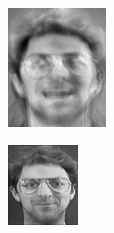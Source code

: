 \begin{figure}[!htb]
\centering
\begin{subfigure}[h]{0.18\textwidth}
  \centering
  \includegraphics[width=2.58cm]{figures/att/rec.png}
\end{subfigure}
\begin{subfigure}[h]{0.18\textwidth}
  \centering
  \includegraphics[width=\linewidth]{figures/att/64_7.jpg}
\end{subfigure}
\begin{subfigure}[h]{0.18\textwidth}
  \centering

\end{subfigure}
\end{figure}
